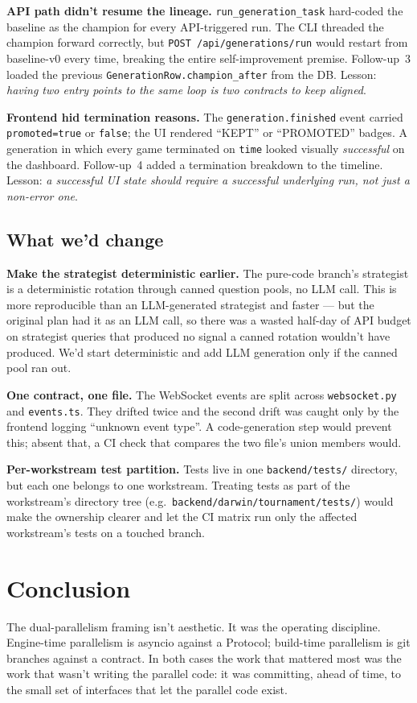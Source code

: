 \documentclass[11pt]{article}
\begin{document}
\textbf{API path didn't resume the lineage.}
\texttt{run\_generation\_task} hard-coded the baseline as the
champion for every API-triggered run. The CLI threaded the champion
forward correctly, but \texttt{POST /api/generations/run} would
restart from baseline-v0 every time, breaking the entire
self-improvement premise. Follow-up~3 loaded the previous
\texttt{GenerationRow.champion\_after} from the DB. Lesson:
\emph{having two entry points to the same loop is two contracts to
keep aligned}.

\textbf{Frontend hid termination reasons.} The
\texttt{generation.finished} event carried \texttt{promoted=true} or
\texttt{false}; the UI rendered ``KEPT'' or ``PROMOTED'' badges. A
generation in which every game terminated on \texttt{time} looked
visually \emph{successful} on the dashboard. Follow-up~4 added a
termination breakdown to the timeline. Lesson: \emph{a successful UI
state should require a successful underlying run, not just a
non-error one}.

\subsection{What we'd change}

\textbf{Make the strategist deterministic earlier.} The pure-code
branch's strategist is a deterministic rotation through canned
question pools, no LLM call. This is more reproducible than an
LLM-generated strategist and faster --- but the original plan had it
as an LLM call, so there was a wasted half-day of API budget on
strategist queries that produced no signal a canned rotation
wouldn't have produced. We'd start deterministic and add LLM
generation only if the canned pool ran out.

\textbf{One contract, one file.} The WebSocket events are split
across \texttt{websocket.py} and \texttt{events.ts}. They drifted
twice and the second drift was caught only by the frontend logging
``unknown event type''. A code-generation step would prevent this;
absent that, a CI check that compares the two file's union members
would.

\textbf{Per-workstream test partition.} Tests live in one
\texttt{backend/tests/} directory, but each one belongs to one
workstream. Treating tests as part of the workstream's directory
tree (e.g.\ \texttt{backend/darwin/tournament/tests/}) would make the
ownership clearer and let the CI matrix run only the affected
workstream's tests on a touched branch.

\section*{Conclusion}

The dual-parallelism framing isn't aesthetic. It was the operating
discipline. Engine-time parallelism is asyncio against a Protocol;
build-time parallelism is git branches against a contract. In both
cases the work that mattered most was the work that wasn't writing
the parallel code: it was committing, ahead of time, to the small set
of interfaces that let the parallel code exist.
\end{document}
